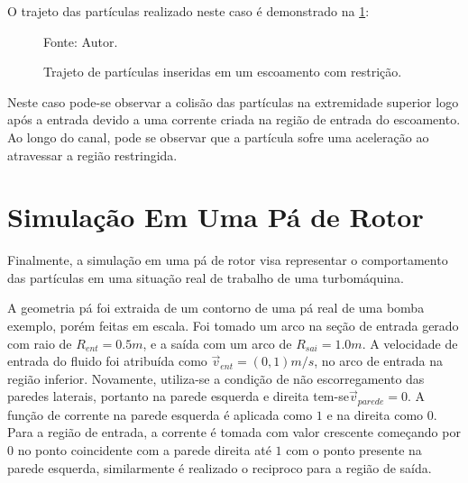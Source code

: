 O trajeto das partículas realizado neste caso é demonstrado na \ref{nozzle_trajectory}:
\begin{figure}[H]
    \centering
     {\raggedleft \scriptsize Fonte: Autor.}
    \caption{Trajeto de partículas inseridas em um escoamento com restrição.}
    \label{nozzle_trajectory}
\end{figure}

Neste caso pode-se observar a colisão das partículas na extremidade superior logo após a entrada devido a uma corrente criada na região de entrada do escoamento.
Ao longo do canal, pode se observar que a partícula sofre uma aceleração ao atravessar a região restringida.

\section{\textbf{Simulação Em Uma Pá de Rotor}}
\label{sec_rotor}
Finalmente, a simulação em uma pá de rotor visa representar o comportamento das partículas em uma situação real de trabalho de uma turbomáquina.

A geometria pá foi extraida de um contorno de uma pá real de uma bomba exemplo, porém feitas em escala.
Foi tomado um arco na seção de entrada gerado com raio de $R_{ent}=0.5m$, e a saída com um arco de $R_{sai}=1.0m$.
A velocidade de entrada do fluido foi atribuída como $\vec{v}_{ent}=(0, 1)m/s$, no arco de entrada na região inferior.
Novamente, utiliza-se a condição de não escorregamento das paredes laterais, portanto na parede esquerda e direita tem-se$\vec{v}_{parede}=0$.
A função de corrente na parede esquerda é aplicada como $1$ e na direita como $0$.
Para a região de entrada, a corrente é tomada com valor crescente começando por $0$ no ponto coincidente com a parede direita até $1$ com o ponto presente na parede esquerda, similarmente é realizado o reciproco para a região de saída.

